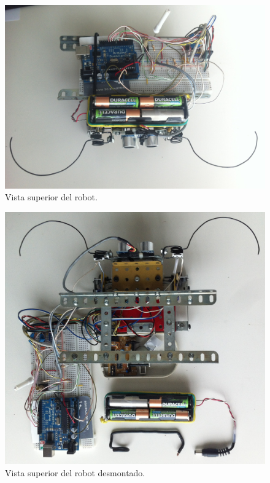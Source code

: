 \documentclass[10pt,a4paper,hidelinks,twocolumn,nobalancelastpage]{article}
\begin{document}
\begin{figure}[H]
\includegraphics[width=\columnwidth]{coco.jpg}
\caption{Vista superior del robot.  \label{fig:coco}}
\end{figure}

\begin{figure}[H]
\includegraphics[width=\columnwidth]{coco-abierto.jpg}
\caption{Vista superior del robot desmontado.  \label{fig:coco-abierto}}
\end{figure}
\newpage
\end{document}
